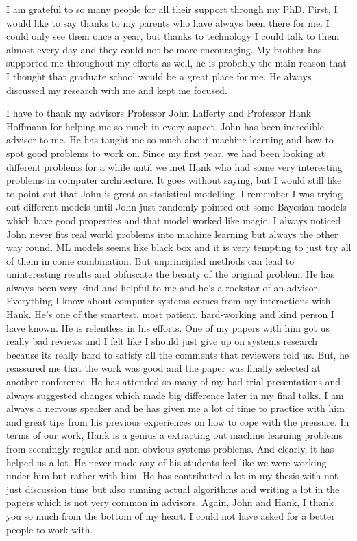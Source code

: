 I am grateful to so many people for all their support through my PhD. First,
I would like to say thanks to my parents who have always been there for me. I could
only see them once a year, but thanks to technology I could talk to them almost every day
and they could not be more encouraging. My brother has supported me throughout
my efforts as well, he is probably the main reason that I thought that graduate
school would be a great place for me. He always discussed my research with me and
kept me focused.

I have to thank my advisors Professor John Lafferty and Professor Hank Hoffmann for helping me so much in every aspect.
John has been incredible advisor to me. He has taught me so much about machine
learning and how to spot good problems to work on. Since my first year, we had been looking at different
problems for a while until we met Hank who had some very interesting problems in
computer architecture. It goes without saying, but I would still like to point out that John is great at statistical modelling.
I remember I was trying out different models until John just randomly
pointed out some Bayesian models which have good properties and that model worked like magic.
I always noticed John never fits real world problems into machine learning
but always the other way round. ML models seems like black box and it is very tempting to just try all of them in come combination.
But unprincipled methods can lead to uninteresting results and obfuscate the beauty of the original problem.
He has always been very kind and helpful to
me and he's a rockstar of an advisor. Everything I know about computer systems comes from
my interactions with Hank.
He's one of the smartest, most patient, hard-working and kind person I have known. He is
relentless in his efforts. One of my papers with him got us really bad reviews and
I felt like I should just give up on systems research because its really hard to
satisfy all the comments that reviewers told us. But, he reassured me that the work was good and
the paper was finally selected at another conference. He has attended so many of my bad trial presentations
and always suggested changes which made big difference later in my final talks.
I am always a nervous speaker and he has given me a lot of time to practice with him
and great tips from his previous experiences on how to cope with the pressure.
In terms of our work, Hank is a genius a extracting out machine learning problems
from seemingly regular and non-obvious systems problems. And clearly, it has helped us a lot.
He never made any of his students feel like we were working under him but rather with him.
He has contributed a lot in my thesis with not just discussion time but also running actual
algorithms and writing a lot in the papers which is not very common in advisors. Again, John and Hank,
I thank you so much from the bottom of my heart. I could not have asked for a better people
to work with.


